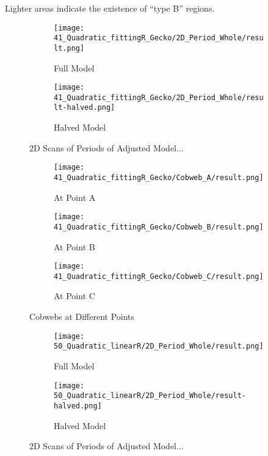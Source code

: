 Lighter areas indicate the existence of ``type B'' regions.

\begin{figure}
    \centering
    \begin{subfigure}{0.4\textwidth}
        \centering
        \texttt{[image: 41\_Quadratic\_fittingR\_Gecko/2D\_Period\_Whole/result.png]}
        \caption{Full Model}
        \label{fig:quadratic.full.fit.2.period.full}
    \end{subfigure}
    \begin{subfigure}{0.4\textwidth}
        \centering
        \texttt{[image: 41\_Quadratic\_fittingR\_Gecko/2D\_Period\_Whole/result-halved.png]}
        \caption{Halved Model}
        \label{fig:quadratic.full.fit.2.period.halved}
    \end{subfigure}
    \caption{2D Scans of Periods of Adjusted Model...}
\end{figure}

\begin{figure}
    \centering
    \begin{subfigure}{0.3\textwidth}
        \centering
        \texttt{[image: 41\_Quadratic\_fittingR\_Gecko/Cobweb\_A/result.png]}
        \caption{At Point A}
        \label{fig:quad.full.fit.2.CobwebA}
    \end{subfigure}
    \begin{subfigure}{0.3\textwidth}
        \centering
        \texttt{[image: 41\_Quadratic\_fittingR\_Gecko/Cobweb\_B/result.png]}
        \caption{At Point B}
        \label{fig:quad.full.fit.2.CobwebB}
    \end{subfigure}
    \begin{subfigure}{0.3\textwidth}
        \centering
        \texttt{[image: 41\_Quadratic\_fittingR\_Gecko/Cobweb\_C/result.png]}
        \caption{At Point C}
        \label{fig:quad.full.fit.2.CobwebC}
    \end{subfigure}
    \caption{Cobwebs at Different Points}
    \label{fig:quad.full.fit.2.Cobwebs}
\end{figure}


\begin{figure}
    \centering
    \begin{subfigure}{0.4\textwidth}
        \centering
        \texttt{[image: 50\_Quadratic\_linearR/2D\_Period\_Whole/result.png]}
        \caption{Full Model}
        \label{fig:quadratic.full.fit.lin.period.full}
    \end{subfigure}
    \begin{subfigure}{0.4\textwidth}
        \centering
        \texttt{[image: 50\_Quadratic\_linearR/2D\_Period\_Whole/result-halved.png]}
        \caption{Halved Model}
        \label{fig:quadratic.full.fit.lin.period.halved}
    \end{subfigure}
    \caption{2D Scans of Periods of Adjusted Model...}
\end{figure}

